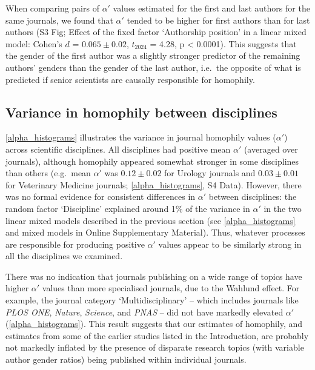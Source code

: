 \documentclass[12pt,]{article}
\begin{document}
When comparing pairs of \(\alpha'\) values estimated for the first and
last authors for the same journals, we found that \(\alpha'\) tended to
be higher for first authors than for last authors (S3 Fig; Effect of the
fixed factor `Authorship position' in a linear mixed model: Cohen's
\(d\) = \(0.065{\pm}0.02\), \(t_{2024}\) = 4.28, p \textless{} 0.0001).
This suggests that the gender of the first author was a slightly
stronger predictor of the remaining authors' genders than the gender of
the last author, i.e.~the opposite of what is predicted if senior
scientists are causally responsible for homophily.

\hypertarget{variance-in-homophily-between-disciplines}{%
\subsection{Variance in homophily between
disciplines}\label{variance-in-homophily-between-disciplines}}

\autoref{alpha_histograms} illustrates the variance in journal homophily
values (\(\alpha'\)) across scientific disciplines. All disciplines had
positive mean \(\alpha'\) (averaged over journals), although homophily
appeared somewhat stronger in some disciplines than others (e.g.~mean
\(\alpha'\) was \(0.12{\pm}0.02\) for Urology journals and
\(0.03{\pm}0.01\) for Veterinary Medicine journals;
\autoref{alpha_histograms}, S4 Data). However, there was no formal
evidence for consistent differences in \(\alpha'\) between disciplines:
the random factor `Discipline' explained around 1\% of the variance in
\(\alpha'\) in the two linear mixed models described in the previous
section (see \autoref{alpha_histograms} and mixed models in Online
Supplementary Material). Thus, whatever processes are responsible for
producing positive \(\alpha'\) values appear to be similarly strong in
all the disciplines we examined.

There was no indication that journals publishing on a wide range of
topics have higher \(\alpha'\) values than more specialised journals,
due to the Wahlund effect. For example, the journal category
`Multidisciplinary' -- which includes journals like \emph{PLOS ONE},
\emph{Nature}, \emph{Science}, and \emph{PNAS} -- did not have markedly
elevated \(\alpha'\) (\autoref{alpha_histograms}). This result suggests
that our estimates of homophily, and estimates from some of the earlier
studies listed in the Introduction, are probably not markedly inflated
by the presence of disparate research topics (with variable author
gender ratios) being published within individual journals.
\end{document}

